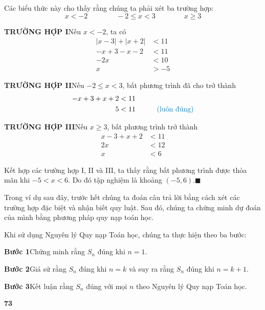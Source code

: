 \begin{minipage}[t]{0.71\textwidth}
    \bigskip\noindent
    Các biểu thức này cho thấy rằng chúng ta phải xét ba trường hợp:
    \[
    x < -2 \qquad\qquad -2 \leqslant x < 3 \qquad\qquad x \geqslant 3
    \]

    \noindent
    \textbf{\textsf{\color{stewartred}TRƯỜNG HỢP I}}\quad Nếu $x < -2$, ta có
    \begin{align*}
    |x - 3| + |x + 2| &< 11 \\
    -x + 3 - x - 2 &< 11 \\
    -2x &< 10 \\
    x &> -5
    \end{align*}

    \noindent
    \textbf{\textsf{\color{stewartred}TRƯỜNG HỢP II}}\quad Nếu $-2 \leqslant x < 3$, bất phương trình đã cho trở thành
    \begin{align*}
    -x + 3 + x + 2 &< 11 \\
    5 &< 11 \qquad\quad \text{\color{stewartcyan}(luôn đúng)}
    \end{align*}

    \noindent
    \textbf{\textsf{\color{stewartred}TRƯỜNG HỢP III}}\quad Nếu $x \geqslant 3$, bất phương trình trở thành
    \begin{align*}
    x - 3 + x + 2 &< 11 \\
    2x &< 12 \\
    x &< 6
    \end{align*}

    \noindent
    Kết hợp các trường hợp I, II và III, ta thấy rằng bất phương trình được thỏa mãn khi $-5 < x < 6$. Do đó tập nghiệm là khoảng $(-5, 6)$.\hfill{\color{stewartcyan}$\blacksquare$}

    \bigskip
    Trong ví dụ sau đây, trước hết chúng ta đoán câu trả lời bằng cách xét các trường hợp đặc biệt và nhận biết quy luật. Sau đó, chúng ta chứng minh dự đoán của mình bằng phương pháp quy nạp toán học.

    \smallskip
    Khi sử dụng Nguyên lý Quy nạp Toán học, chúng ta thực hiện theo ba bước:

    \smallskip
    \noindent
    \textbf{\textsf{Bước 1}}\quad Chứng minh rằng $S_n$ đúng khi $n = 1$.

    \smallskip
    \noindent
    \textbf{\textsf{Bước 2}}\quad Giả sử rằng $S_n$ đúng khi $n = k$ và suy ra rằng $S_n$ đúng khi $n = k + 1$.

    \smallskip
    \noindent
    \textbf{\textsf{Bước 3}}\quad Kết luận rằng $S_n$ đúng với mọi $n$ theo Nguyên lý Quy nạp Toán học.
\end{minipage}

\vfill
\begin{flushright}
    \textbf{\textsf{73}}
\end{flushright}